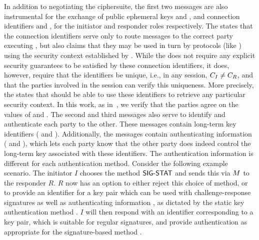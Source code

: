In addition to negotiating the ciphersuite, the first two messages are
also instrumental for the exchange of public ephemeral keys \mGx{} and \mGy{},
and connection identifiers \mCi{} and \mCr{}, for the initiator and responder
roles respectively.
%
The \mSpec{} states that the connection identifiers serve only to route messages
to the correct party executing \mEdhoc{}, but also claims that they may be
used in turn by protocols (like \mOscore{}) using the security context
established by \mEdhoc{}.
%
While the \mSpec{} does not require any explicit security guarantees to be
satisfied by these connection identifiers, it does, however, require that the
identifiers be unique, i.e., in any session, $C_I{} \neq C_R{}$, and that the
parties involved in the session can verify this uniqueness.
%
More precisely, the \mSpec{} states that \mOscore{} should be able to use these
identifiers to retrieve any particular security context.
%
In this work, as in~\cite{Norr21}, we verify that the parties agree on the
values of \mCi{} and \mCr{}.
%
The second and third messages also serve to identify and authenticate each
party to the other.
%
These messages contain long-term key identifiers (\mIdcredi{} and \mIdcredr{}).
%
Additionally, the messages contain authenticating information
(\mAuthi{} and \mAuthr{}), which lets each
party know that the other party does indeed control the long-term key
associated with these identifiers.
%
The authentication information is different for each authentication method.
%
Consider the following example scenario.
%
The initiator $I$ chooses the method $\textsf{SIG-STAT}{}$ and sends this via
$M{}$ to the responder $R$.
%
$R$ now has an option to either reject this choice of method, or to provide an
identifier \mIdcredr{} for a key pair which can be used with challenge-response
signatures as well as authenticating information \mAuthr{}, as dictated by
the static key authentication method \mStat{}.
%
$I$ will then respond with an identifier \mIdcredi{} corresponding to a key
pair, which is suitable for regular signatures, and provide authentication
\mAuthi{} as appropriate for the signature-based method \mSig{}.

